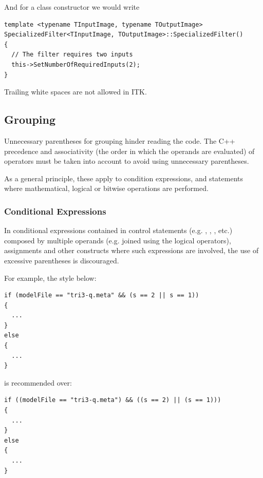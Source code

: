 And for a class constructor we would write

\small
\begin{verbatim}
template <typename TInputImage, typename TOutputImage>
SpecializedFilter<TInputImage, TOutputImage>::SpecializedFilter()
{
  // The filter requires two inputs
  this->SetNumberOfRequiredInputs(2);
}
\end{verbatim}
\normalsize

Trailing white spaces are not allowed in ITK.


\subsection{Grouping}%
\label{subsec:Grouping}

Unnecessary parentheses for grouping hinder reading the code.
The C++ precedence and associativity (the order in which the operands are
evaluated) of operators must be taken into account to avoid using unnecessary
parentheses.

As a general principle, these apply to condition expressions, and statements
where mathematical, logical or bitwise operations are performed.


\subsubsection{Conditional Expressions}%
\label{subsubsec:ConditionalExpressions}

In conditional expressions contained in control statements (e.g. ,
, , etc.) composed by multiple operands (e.g. joined
using the logical operators), assignments and other constructs where such
expressions are involved, the use of excessive parentheses is discouraged.

For example, the style below:

\small
\begin{verbatim}
if (modelFile == "tri3-q.meta" && (s == 2 || s == 1))
{
  ...
}
else
{
  ...
}
\end{verbatim}
\normalsize

is recommended over:

\small
\begin{verbatim}
if ((modelFile == "tri3-q.meta") && ((s == 2) || (s == 1)))
{
  ...
}
else
{
  ...
}
\end{verbatim}
\normalsize


